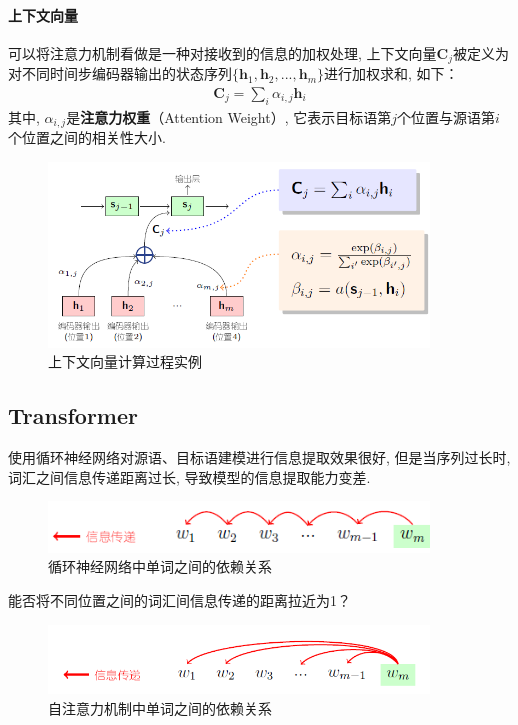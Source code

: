 \documentclass[a4paper]{article}
\theoremstyle{definition}
\numberwithin{equation}{section}
\begin{document}
    \paragraph{上下文向量}
可以将注意力机制看做是一种对接收到的信息的加权处理, 上下文向量$\mathbf{C}_j$被定义为对不同时间步编码器输出的状态序列$\{ \mathbf{h}_1,  \mathbf{h}_2, ..., \mathbf{h}_m \}$进行加权求和, 如下：
    \begin{eqnarray}
    \mathbf{C}_j=\sum_{i} \alpha_{i, j} \mathbf{h}_i
    \end{eqnarray}
其中, $\alpha_{i, j}$是{\small\sffamily\bfseries{注意力权重}}（Attention Weight）, 它表示目标语第$j$个位置与源语第$i$个位置之间的相关性大小. 

\begin{figure}[htp]
    \centering
\includegraphics[width=0.9\textwidth]{context_vector_cacl.png}
    \caption{上下文向量计算过程实例}
    \end{figure}

\subsection{Transformer}
使用循环神经网络对源语、目标语建模进行信息提取效果很好, 但是当序列过长时, 词汇之间信息传递距离过长, 导致模型的信息提取能力变差. 
\begin{figure}[htp]
    \centering
    \includegraphics[width=0.9\textwidth]{self-attention1.png}
    \caption{循环神经网络中单词之间的依赖关系}
    \end{figure}
 能否将不同位置之间的词汇间信息传递的距离拉近为1？ 
 \begin{figure}[htp]
    \centering
    \includegraphics[width=0.9\textwidth]{self_attention2.png}
    \caption{自注意力机制中单词之间的依赖关系}
    \end{figure}
\end{document}
